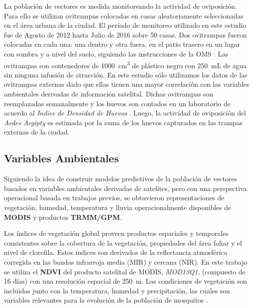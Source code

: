   \par La población de vectores es medida monitoreando la actividad de oviposición.
    Para ello se utilizan ovitrampas colocadas en casas aleatoriamente seleccionadas
    en el área urbana de la ciudad. El período de monitoreo utilizado en este
    estudio fue de Agosto de 2012 hasta Julio de 2016 sobre 50 casas. Dos
    ovitrampas fueron colocadas en cada una: una dentro y otra fuera,
    en el patio trasero en un lugar con sombra y a nivel del suelo, siguiendo
    las instrucciones de la OMS \cite{peridomestic}. Las ovitrampas son contenedores
    de \SI{1000}{\centi\meter\cubed} de plástico negro con \SI{250}{\milli\liter}
    de agua sin ninguna infusión de atracción.
    En este estudio sólo utilizamos los datos de las ovitrampas externas dado
    que ellas tienen una mayor correlación con las variables ambientales
    derivadas de información satelital. Dichas ovitrampas son reemplazadas
    semanalmente y los huevos son contados en un laboratorio de acuerdo al
    \textit{Indice de Densidad de Huevos} \cite{indice_huevos}. Luego, la
    actividad de oviposición del \textit{Aedes Aegipty} es estimada por la suma
    de los huevos capturados en las trampas externas de la ciudad.



\subsection{Variables Ambientales}

  \par Siguiendo la idea de construir modelos predictivos de la población de
    vectores basados en variables ambientales derivadas de satelites, pero con una
    perspectiva operacional basada en trabajos previos, se obtuvieron representaciones
    de vegetación, humedad, temperatura y lluvia operacionalmente disponibles
    de \textbf{MODIS} y productos \textbf{TRMM/GPM}.

  \par Los índices de vegetación global proveen productos espaciales y
    temporales consistentes sobre la cobertura de la vegetación,
    propiedades del área foliar y el nivel de clorofila. Estos indices son
    derivados de la reflectancia atmosférica
    corregida en las bandas infrarroja media (MIR) y cercana (NIR).
    En este trabajo se utiliza el \textbf{NDVI} del producto satelital
    de MODIS, \textit{MOD13Q1}, (compuesto de 16 días) con una resolución espacial de
    \SI{250}{\meter}.
    Las condiciones de vegetación son incluidas junto con la temperatura,
    humedad y precipitación, las cuales son variables relevantes para la evolución de la
    población de mosquitos \cite{ndwi_erffectiveness, rs_invertebrate}.

